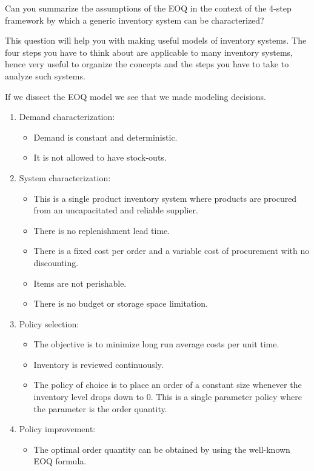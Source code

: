 \begin{question}
  Can you summarize the assumptions of the EOQ in the context of the 4-step framework by which
  a generic inventory system can be characterized?

  This question will help you with making useful models of inventory
  systems. The four steps you have to think about are applicable to
  many inventory systems, hence very useful to organize the concepts
  and the steps you have to take to analyze such systems.
\end{question}

  \begin{solution}
If we dissect the EOQ model we see that we made modeling decisions.
\begin{enumerate}
\item Demand characterization: 
\begin{itemize}
\item Demand is constant and deterministic.
\item It is not allowed to have stock-outs.
\end{itemize}
\item System characterization: 
\begin{itemize}
\item This is a single product inventory system where products are procured from an uncapacitated and reliable supplier. 
\item There is no replenishment lead time.
\item There is a fixed cost per order and a variable cost of procurement with no discounting. 
\item Items are not perishable.
\item There is no budget or storage space limitation.
\end{itemize}
\item Policy selection:
\begin{itemize}
\item The objective is to minimize long run average costs per unit time. 
\item Inventory is reviewed continuously.
\item The policy of choice is to place an order of a constant size whenever the inventory level drops down to 0. This is a single parameter policy where the parameter is the order quantity.
\end{itemize}
\item Policy improvement:
\begin{itemize}
\item The optimal order quantity can be obtained by using the well-known EOQ formula.
\end{itemize}
\end{enumerate}
  \end{solution}


